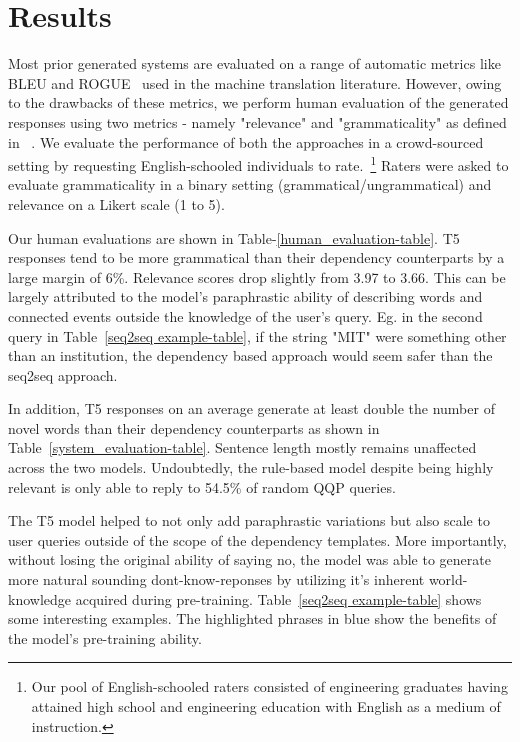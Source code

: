 \documentclass[11pt,a4paper]{article}
\begin{document}
\section{Results}
Most prior generated systems are evaluated on a range of automatic metrics like BLEU and ROGUE~\cite{papineni2002bleu} used in the machine translation literature. However, owing to the drawbacks of these metrics, we perform human evaluation of the generated responses using two metrics - namely "relevance" and "grammaticality" as defined in ~\citet{dhole-manning-2020-syn}. We evaluate the performance of both the approaches in a crowd-sourced setting by requesting English-schooled individuals to rate.~\footnote{Our pool of English-schooled raters consisted of engineering graduates having attained high school and engineering education with English as a medium of instruction.} Raters were asked to evaluate grammaticality in a binary setting (grammatical/ungrammatical) and relevance on a Likert scale (1 to 5).

Our human evaluations are shown in Table-\ref{human_evaluation-table}. T5 responses tend to be more grammatical than their dependency counterparts by a large margin of 6\%. Relevance scores drop slightly from 3.97 to 3.66. This can be largely attributed to the model's paraphrastic ability of describing words  and connected events outside the knowledge of the user's query. Eg. in the second query in Table~\ref{seq2seq example-table}, if the string "MIT" were something other than an institution, the dependency based approach would seem safer than the seq2seq approach.  

In addition, T5 responses on an average generate at least double the number of novel words than their dependency counterparts as shown in Table~\ref{system_evaluation-table}. Sentence length mostly remains unaffected across the two models. Undoubtedly, the rule-based model despite being highly relevant is only able to reply to 54.5\% of random QQP queries.

The T5 model helped to not only add paraphrastic variations but also scale to user queries outside of the scope of the dependency templates. More importantly, without losing the original ability of saying no, the model was able to generate more natural sounding dont-know-reponses by utilizing it's inherent world-knowledge acquired during pre-training. Table~\ref{seq2seq example-table} shows some interesting examples. The highlighted phrases in blue show the benefits of the model's pre-training ability.
\end{document}
